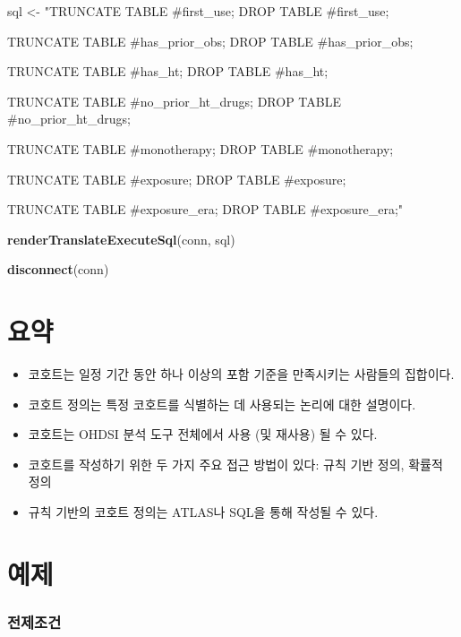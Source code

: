 \documentclass[11pt]{book}
\newenvironment{Shaded}{\begin{snugshade}}{\end{snugshade}}
\newcommand{\KeywordTok}[1]{\textcolor[rgb]{0.13,0.29,0.53}{\textbf{#1}}}
\newcommand{\StringTok}[1]{\textcolor[rgb]{0.31,0.60,0.02}{#1}}
\newcommand{\NormalTok}[1]{#1}
\theoremstyle{definition}
\theoremstyle{definition}
\theoremstyle{definition}
\theoremstyle{remark}
\let\BeginKnitrBlock\begin \let\EndKnitrBlock\end
\begin{document}
\begin{Shaded}
\begin{Highlighting}[]
\NormalTok{sql <-}\StringTok{ "TRUNCATE TABLE #first_use;}
\StringTok{DROP TABLE #first_use;}

\StringTok{TRUNCATE TABLE #has_prior_obs;}
\StringTok{DROP TABLE #has_prior_obs;}

\StringTok{TRUNCATE TABLE #has_ht;}
\StringTok{DROP TABLE #has_ht;}

\StringTok{TRUNCATE TABLE #no_prior_ht_drugs;}
\StringTok{DROP TABLE #no_prior_ht_drugs;}

\StringTok{TRUNCATE TABLE #monotherapy;}
\StringTok{DROP TABLE #monotherapy;}

\StringTok{TRUNCATE TABLE #exposure;}
\StringTok{DROP TABLE #exposure;}

\StringTok{TRUNCATE TABLE #exposure_era;}
\StringTok{DROP TABLE #exposure_era;"}

\KeywordTok{renderTranslateExecuteSql}\NormalTok{(conn, sql)}

\KeywordTok{disconnect}\NormalTok{(conn)}
\end{Highlighting}
\end{Shaded}

\section{요약}\label{-8}

\BeginKnitrBlock{rmdsummary}
\begin{itemize}
\item
  코호트는 일정 기간 동안 하나 이상의 포함 기준을 만족시키는 사람들의
  집합이다.
\item
  코호트 정의는 특정 코호트를 식별하는 데 사용되는 논리에 대한 설명이다.
\item
  코호트는 OHDSI 분석 도구 전체에서 사용 (및 재사용) 될 수 있다.
\item
  코호트를 작성하기 위한 두 가지 주요 접근 방법이 있다: 규칙 기반 정의,
  확률적 정의
\item
  규칙 기반의 코호트 정의는 ATLAS나 SQL을 통해 작성될 수 있다.
\end{itemize}
\EndKnitrBlock{rmdsummary}

\section{예제}\label{-4}

\subsubsection*{전제조건}\label{-2}
\end{document}
